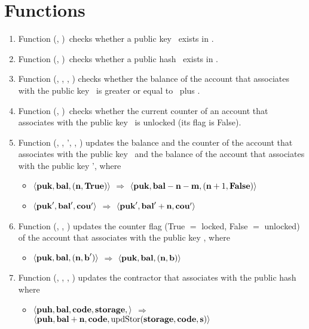 \documentclass[a4paper]{llncs}
\begin{document}
\section{Functions}
\begin{enumerate}
    \item Function \CHECKPUB (\PUK, \MANAGERS)\ checks whether a public key \PUK\ exists in \MANAGERS.
    \item Function \CHECKPUH (\PUH, \CONTRACTORS)\ checks whether a public hash \PUH\ exists in \CONTRACTORS.
    \item Function \CHECKBAL (\MANAGERS, \PUK, \NTEZ, \MTEZ) checks whether the balance of the account that associates with the public key \PUK\ is greater or equal to \NTEZ\ plus \MTEZ.
    \item Function \CHECKCOU (\MANAGERS, \PUK)\ checks whether the current counter of an account that associates with the public key \PUK\ is unlocked (its flag is False).

    \item Function \UPDATESUCC(\MANAGERS, \PUK, \PUK', \NTEZ, \MTEZ) updates the balance and the counter of the account that associates with the public key \PUK\ and the balance of the account that associates with the public key \PUK', where
    \begin{itemize}
        \item[]  $\langle  \textbf{puk}, \textbf{bal}, (\textbf{n}, \textbf{True}) \rangle $ $\Rightarrow$ $\langle  \textbf{puk}, \textbf{bal} - \textbf{n} - \textbf{m}, (\textbf{n} + 1, \textbf{False}) \rangle $      
        \item[] $\langle  \textbf{puk}', \textbf{bal}', \textbf{cou}' \rangle$ $\Rightarrow$ $\langle  \textbf{puk}', \textbf{bal}' + \textbf{n}, \textbf{cou}' \rangle $         
    \end{itemize}
    
    \item Function \UPDATECOU(\MANAGERS, \PUK, \BOOLEAN) updates the counter flag (True $=$ locked, False $=$ unlocked) of the account that associates with the public key \PUK, where
    \begin{itemize}
        \item[]  $\langle  \textbf{puk}, \textbf{bal}, (\textbf{n}, \textbf{b}') \rangle $ $\Rightarrow$ $\langle  \textbf{puk}, \textbf{bal}, (\textbf{n}, \textbf{b}) \rangle $ 
    \end{itemize}
    
    \item Function  \UPDATECONSTR (\CONTRACTORS, \PUH, \NTEZ, \STRING) updates the contractor that associates with the public hash \PUH\, where
    \begin{itemize}
        \item[] $\langle  \textbf{puh}, \textbf{bal}, \textbf{code}, \textbf{storage}, \rangle $ $\Rightarrow$ $\langle  \textbf{puh}, \textbf{bal} + \textbf{n}, \textbf{code}, \\ \textup{updStor}(\textbf{storage},\textbf{code},\textbf{s}) \rangle $
    \end{itemize}
    

\end{enumerate}
\end{document}
